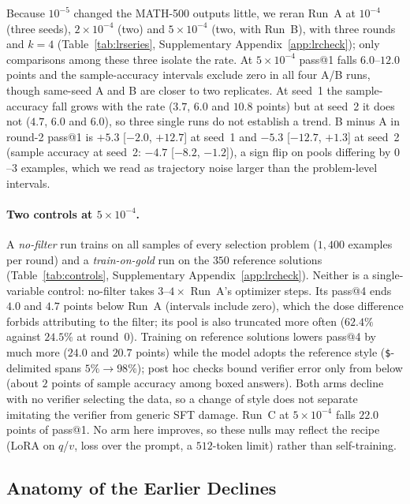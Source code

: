 \documentclass[runningheads]{llncs}
\begin{document}
Because $10^{-5}$ changed the MATH-500 outputs little, we reran Run~A at
$10^{-4}$ (three seeds), $2\times10^{-4}$ (two) and $5\times10^{-4}$ (two, with
Run~B), with three rounds and $k=4$ (Table~\ref{tab:lrseries}, Supplementary
Appendix~\ref{app:lrcheck}); only comparisons among these three isolate the rate.
At $5\times10^{-4}$ pass@1 falls $6.0$--$12.0$ points and the sample-accuracy
intervals exclude zero in all four A/B runs, though same-seed A and B are closer
to two replicates. At seed~1 the sample-accuracy fall grows with the rate ($3.7$,
$6.0$ and $10.8$ points) but at seed~2 it does not ($4.7$, $6.0$ and $6.0$), so
three single runs do not establish a trend. B minus A in round-2 pass@1 is $+5.3$
[$-2.0$, $+12.7$] at seed~1 and $-5.3$ [$-12.7$, $+1.3$] at seed~2 (sample
accuracy at seed~2: $-4.7$ [$-8.2$, $-1.2$]), a sign flip on pools differing by
$0$--$3$ examples, which we read as trajectory noise larger than the
problem-level intervals.

\paragraph{Two controls at $5\times10^{-4}$.}
A \emph{no-filter} run trains on all samples of every selection problem
($1{,}400$ examples per round) and a \emph{train-on-gold} run on the $350$
reference solutions (Table~\ref{tab:controls}, Supplementary
Appendix~\ref{app:lrcheck}). Neither is a single-variable control: no-filter
takes $3$--$4\times$ Run~A's optimizer steps. Its pass@4 ends $4.0$ and $4.7$
points below Run~A (intervals include zero), which the dose difference forbids
attributing to the filter; its pool is also truncated more often ($62.4\%$
against $24.5\%$ at round~0). Training on reference solutions lowers pass@4 by much
more ($24.0$ and $20.7$ points) while the model adopts the reference style
(\texttt{\$}-delimited spans $5\%\to98\%$); post hoc checks bound verifier error
only from below (about $2$ points of sample accuracy among boxed answers). Both
arms decline with no verifier selecting the data, so a change of style does not
separate imitating the verifier from generic SFT damage. Run~C at
$5\times10^{-4}$ falls $22.0$ points of pass@1. No arm here improves, so these
nulls may reflect the recipe (LoRA on $q$/$v$, loss over the prompt, a
$512$-token limit) rather than self-training.

\subsection{Anatomy of the Earlier Declines}
\label{sec:anatomy}
\end{document}
